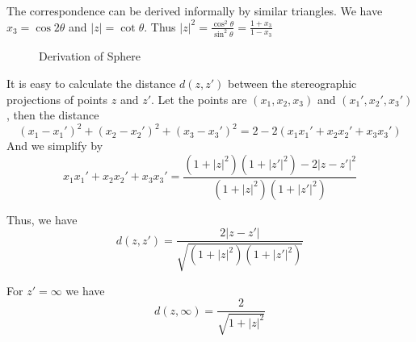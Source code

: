 \documentclass[../main.tex]{subfiles}
\begin{document}
\begin{remark}
The correspondence can be derived informally by similar triangles.
We have $x_3 = \cos 2 \theta$ and $\left|z\right| = \cot \theta$. Thus $\displaystyle  \left|z\right|^2 = \frac{\cos ^2 \theta}{\sin ^2 \theta} = \frac{1+x_3}{1-x_3}$
\begin{figure}[H]
    \centering
    \caption{Derivation of Sphere}
    \label{fig:derivation-of-sphere}
\end{figure}
\end{remark}

It is easy to calculate the distance $d(z,z')$ between the stereographic projections of points $z$ and $z'$. Let the points are $(x_1,x_2,x_3)$ and $(x_1',x_2',x_3')$, then the distance
\begin{equation*}
	(x_1-x_1')^2+(x_2-x_2')^2+(x_3-x_3')^2 = 2-2(x_1x_1'+x_2x_2'+x_3x_3')
\end{equation*}
And we simplify by
\begin{equation*}
x_1x_1'+x_2x_2'+x_3x_3' = \frac{(1+\left|z\right|^2)(1+\left|z'\right|^2) - 2 \left|z-z'\right|^2 }{(1+\left|z\right|^2)(1+\left|z'\right|^2)}
\end{equation*}

Thus, we have
\begin{equation}
d(z,z') = \frac{2 \left|z-z'\right|}{\sqrt{(1+\left|z\right|^2)(1+\left|z'\right|^2)}}
\end{equation}

For $z' = \infty $ we have
\begin{equation}
d(z,\infty )=\frac{2}{\sqrt{1+\left|z\right|^2}}
\end{equation}
\end{document}

